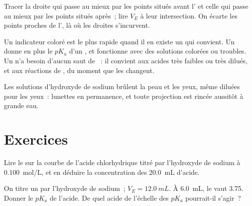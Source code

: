\begin{method}\label{met:g12:ph-conductivity-titrations:two-lines}
Tracer la droite qui passe au mieux par les points situés avant
l' et celle qui passe au mieux par les points situés après~;
lire $V_E$ à leur intersection. On écarte les points proches de
l', là où les droites s'incurvent.
\end{method}

\begin{remark}\label{rem:g12:ph-conductivity-titrations:which}
Un indicateur coloré est le plus rapide quand il en existe un qui
convient. Un  donne en plus le $pK_a$ d'un , et fonctionne avec des solutions colorées ou troubles. Un
 n'a besoin d'aucun saut de ~: il convient
aux acides très faibles ou très dilués, et aux réactions de
, du moment que les  changent.
\end{remark}

\begin{safety}{}
Les solutions d'hydroxyde de sodium brûlent la peau et les yeux, même
diluées pour les yeux~: lunettes en permanence, et toute projection est
rincée aussitôt à grande eau.
\end{safety}

\section{Exercices}


\begin{exercise}[$\star$]\label{exo:g12:ph-conductivity-titrations:1}
Lire le  sur la courbe de l'acide chlorhydrique
titré par l'hydroxyde de sodium à \qty{0.100}{mol/L}, et en déduire la
concentration des \qty{20.0}{mL} d'acide.
\end{exercise}

\begin{exercise}[$\star$]\label{exo:g12:ph-conductivity-titrations:2}
On titre un  par l'hydroxyde de sodium~; $V_E = \qty{12.0}{mL}$.
À
\qty{6.0}{mL}, le  vaut 3.75. Donner le $pK_a$ de l'acide. De quel
acide de l'échelle des $pK_a$ pourrait-il s'agir~?
\end{exercise}


